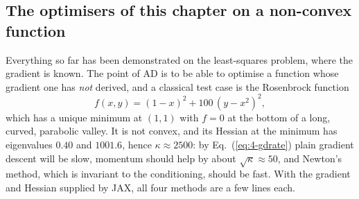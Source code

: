 \subsection{The optimisers of this chapter on a non-convex function}
\label{sec:adrosenbrock}

Everything so far has been demonstrated on the least-squares problem, where
the gradient is known.  The point of AD is to be able to optimise a function
whose gradient one has \emph{not} derived, and a classical test case is the
Rosenbrock function~\cite{rosenbrock1960}
\begin{equation}
  f(x,y) = (1-x)^{2} + 100\,(y-x^{2})^{2},
  \label{eq:4-rosenbrock}
\end{equation}
which has a unique minimum at $(1,1)$ with $f=0$ at the bottom of a long,
curved, parabolic valley.  It is not convex, and its Hessian at the minimum
has eigenvalues $0.40$ and $1001.6$, hence $\kappa\approx2500$: by
Eq.~(\ref{eq:4-gdrate}) plain gradient descent will be slow, momentum should
help by about $\sqrt{\kappa}\approx50$, and Newton's method, which is
invariant to the conditioning, should be fast.  With the gradient and Hessian
supplied by JAX, all four methods are a few lines each.

